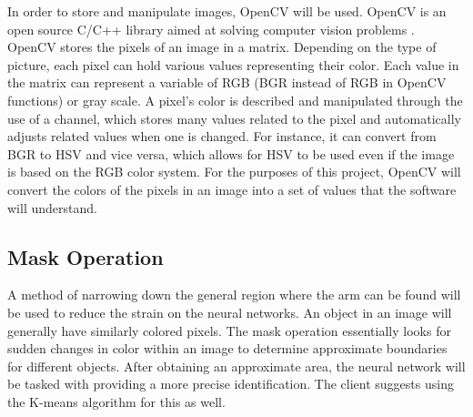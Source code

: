 \documentclass[10pt,journal,compsoc, draftclsnofoot,onecolumn]{IEEEtran}
\begin{document}
\noindent
In order to store and manipulate images, OpenCV will be used. OpenCV is an open source C/C++ library aimed at solving computer vision problems \cite{1:online}. OpenCV stores the pixels of an image in a matrix. Depending on the type of picture, each pixel can hold various values representing their color. Each value in the matrix can represent a variable of RGB (BGR instead of RGB in OpenCV functions) or gray scale. A pixel's color is described and manipulated through the use of a channel, which stores many values related to the pixel and automatically adjusts related values when one is changed. For instance, it can convert from BGR to HSV and vice versa, which allows for HSV to be used even if the image is based on the RGB color system. For the purposes of this project, OpenCV will convert the colors of the pixels in an image into a set of values that the software will understand.

\subsection{Mask Operation}
A method of narrowing down the general region where the arm can be found will be used to reduce the strain on the neural networks. An object in an image will generally have similarly colored pixels. The mask operation essentially looks for sudden changes in color within an image to determine approximate boundaries for different objects. After obtaining an approximate area, the neural network will be tasked with providing a more precise identification. The client suggests using the K-means algorithm for this as well.
\end{document}
